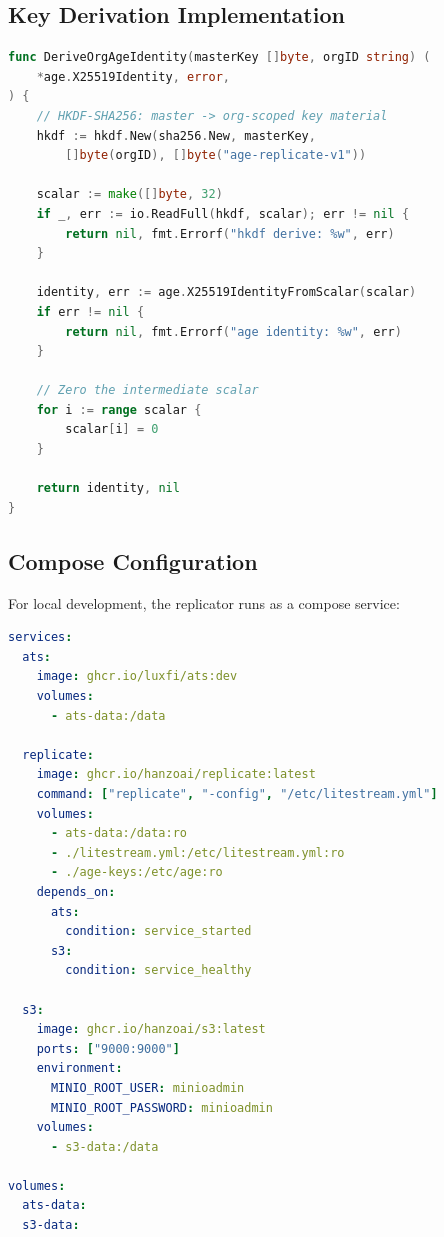 \documentclass[11pt,a4paper]{article}
\begin{document}
\subsection{Key Derivation Implementation}

\begin{lstlisting}[language=Go,caption={Per-org age key derivation.}]
func DeriveOrgAgeIdentity(masterKey []byte, orgID string) (
    *age.X25519Identity, error,
) {
    // HKDF-SHA256: master -> org-scoped key material
    hkdf := hkdf.New(sha256.New, masterKey,
        []byte(orgID), []byte("age-replicate-v1"))

    scalar := make([]byte, 32)
    if _, err := io.ReadFull(hkdf, scalar); err != nil {
        return nil, fmt.Errorf("hkdf derive: %w", err)
    }

    identity, err := age.X25519IdentityFromScalar(scalar)
    if err != nil {
        return nil, fmt.Errorf("age identity: %w", err)
    }

    // Zero the intermediate scalar
    for i := range scalar {
        scalar[i] = 0
    }

    return identity, nil
}
\end{lstlisting}

\subsection{Compose Configuration}

For local development, the replicator runs as a compose service:

\begin{lstlisting}[language=YAML,caption={compose.yml excerpt for replicate sidecar.}]
services:
  ats:
    image: ghcr.io/luxfi/ats:dev
    volumes:
      - ats-data:/data

  replicate:
    image: ghcr.io/hanzoai/replicate:latest
    command: ["replicate", "-config", "/etc/litestream.yml"]
    volumes:
      - ats-data:/data:ro
      - ./litestream.yml:/etc/litestream.yml:ro
      - ./age-keys:/etc/age:ro
    depends_on:
      ats:
        condition: service_started
      s3:
        condition: service_healthy

  s3:
    image: ghcr.io/hanzoai/s3:latest
    ports: ["9000:9000"]
    environment:
      MINIO_ROOT_USER: minioadmin
      MINIO_ROOT_PASSWORD: minioadmin
    volumes:
      - s3-data:/data

volumes:
  ats-data:
  s3-data:
\end{lstlisting}
\end{document}
